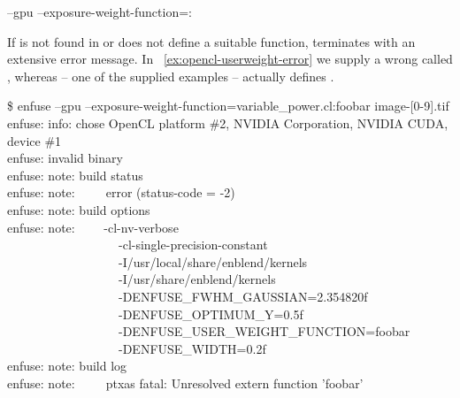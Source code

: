 \begin{literal}
  --gpu --exposure-weight-function=:\feasiblebreak
\end{literal}

If  is not found in  or does not define a suitable
function, \App{} terminates with an extensive error message.  In
\exampleName~\ref{ex:opencl-userweight-error} we supply a wrong  called
, whereas  -- one of the supplied examples --
actually defines .

\begin{exemplar}
  \begin{maxipage}
    \begin{terminal}
\$ enfuse --gpu --exposure-weight-function=variable\_power.cl:foobar image-[0-9].tif \\
enfuse: info: chose OpenCL platform \#2, NVIDIA Corporation, NVIDIA CUDA, device \#1 \\
enfuse: invalid binary \\
enfuse: note: build status \\
enfuse: note:~~~~~error (status-code = -2) \\
enfuse: note: build options \\
enfuse: note: ~~~~-cl-nv-verbose \bslash \\
~~~~~~~~~~~~~~~~~~-cl-single-precision-constant \bslash \\
~~~~~~~~~~~~~~~~~~-I/usr/local/share/enblend/kernels  \bslash \\
~~~~~~~~~~~~~~~~~~-I/usr/share/enblend/kernels \bslash \\
~~~~~~~~~~~~~~~~~~-DENFUSE\_FWHM\_GAUSSIAN=2.354820f \bslash \\
~~~~~~~~~~~~~~~~~~-DENFUSE\_OPTIMUM\_Y=0.5f \bslash \\
~~~~~~~~~~~~~~~~~~-DENFUSE\_USER\_WEIGHT\_FUNCTION=foobar \bslash \\
~~~~~~~~~~~~~~~~~~-DENFUSE\_WIDTH=0.2f \\
enfuse: note: build log \\
enfuse: note:~~~~~ptxas fatal: Unresolved extern function 'foobar'
    \end{terminal}
  \end{maxipage}

  \caption[ user-weight error]%
          {\label{ex:opencl-userweight-error}%
            Error output of \App{} for an invalid (here: unknown) user-defined 
            exposure-weight function.  The actual error output error differs for different
            graphics-card manufacturers.}
\end{exemplar}



